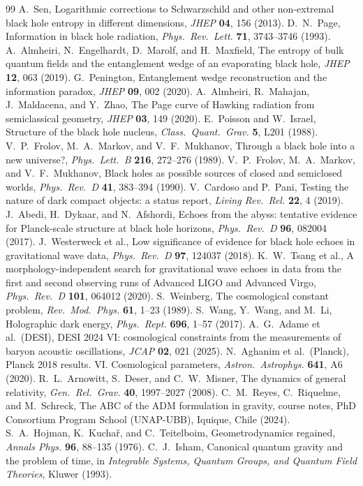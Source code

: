 \documentclass[11pt,letterpaper]{article}
\begin{document}
\begin{thebibliography}{99}
 A.~Sen, Logarithmic corrections to Schwarzschild and other non-extremal black hole entropy in different dimensions, \emph{JHEP} \textbf{04}, 156 (2013).
 D.~N.~Page, Information in black hole radiation, \emph{Phys.\ Rev.\ Lett.} \textbf{71}, 3743--3746 (1993).
 A.~Almheiri, N.~Engelhardt, D.~Marolf, and H.~Maxfield, The entropy of bulk quantum fields and the entanglement wedge of an evaporating black hole, \emph{JHEP} \textbf{12}, 063 (2019).
 G.~Penington, Entanglement wedge reconstruction and the information paradox, \emph{JHEP} \textbf{09}, 002 (2020).
 A.~Almheiri, R.~Mahajan, J.~Maldacena, and Y.~Zhao, The Page curve of Hawking radiation from semiclassical geometry, \emph{JHEP} \textbf{03}, 149 (2020).
 E.~Poisson and W.~Israel, Structure of the black hole nucleus, \emph{Class.\ Quant.\ Grav.} \textbf{5}, L201 (1988).
 V.~P.~Frolov, M.~A.~Markov, and V.~F.~Mukhanov, Through a black hole into a new universe?, \emph{Phys.\ Lett.\ B} \textbf{216}, 272--276 (1989).
 V.~P.~Frolov, M.~A.~Markov, and V.~F.~Mukhanov, Black holes as possible sources of closed and semiclosed worlds, \emph{Phys.\ Rev.\ D} \textbf{41}, 383--394 (1990).
 V.~Cardoso and P.~Pani, Testing the nature of dark compact objects: a status report, \emph{Living Rev.\ Rel.} \textbf{22}, 4 (2019).
 J.~Abedi, H.~Dykaar, and N.~Afshordi, Echoes from the abyss: tentative evidence for Planck-scale structure at black hole horizons, \emph{Phys.\ Rev.\ D} \textbf{96}, 082004 (2017).
 J.~Westerweck et al., Low significance of evidence for black hole echoes in gravitational wave data, \emph{Phys.\ Rev.\ D} \textbf{97}, 124037 (2018).
 K.~W.~Tsang et al., A morphology-independent search for gravitational wave echoes in data from the first and second observing runs of Advanced LIGO and Advanced Virgo, \emph{Phys.\ Rev.\ D} \textbf{101}, 064012 (2020).
 S.~Weinberg, The cosmological constant problem, \emph{Rev.\ Mod.\ Phys.} \textbf{61}, 1--23 (1989).
 S.~Wang, Y.~Wang, and M.~Li, Holographic dark energy, \emph{Phys.\ Rept.} \textbf{696}, 1--57 (2017).
 A.~G.~Adame et al.\ (DESI), DESI 2024 VI: cosmological constraints from the measurements of baryon acoustic oscillations, \emph{JCAP} \textbf{02}, 021 (2025).
 N.~Aghanim et al.\ (Planck), Planck 2018 results. VI. Cosmological parameters, \emph{Astron.\ Astrophys.} \textbf{641}, A6 (2020).
 R.~L.~Arnowitt, S.~Deser, and C.~W.~Misner, The dynamics of general relativity, \emph{Gen.\ Rel.\ Grav.} \textbf{40}, 1997--2027 (2008).
 C.~M.~Reyes, C.~Riquelme, and M.~Schreck, The ABC of the ADM formulation in gravity, course notes, PhD Consortium Program School (UNAP-UBB), Iquique, Chile (2024).
 S.~A.~Hojman, K.~Kucha\v{r}, and C.~Teitelboim, Geometrodynamics regained, \emph{Annals Phys.} \textbf{96}, 88--135 (1976).
 C.~J.~Isham, Canonical quantum gravity and the problem of time, in \emph{Integrable Systems, Quantum Groups, and Quantum Field Theories}, Kluwer (1993).

\end{thebibliography}
\end{document}
